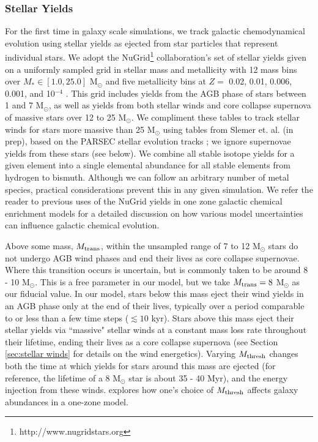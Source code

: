 \documentclass[twocolumn]{aastex61}
\begin{document}
\subsubsection{Stellar Yields}
\label{sec:yields}
For the first time in galaxy scale simulations, we track galactic chemodynamical evolution using stellar yields as ejected from star particles that represent individual stars. We adopt the NuGrid\footnote{http://www.nugridstars.org} collaboration's set of stellar yields given on a uniformly sampled grid in stellar mass and metallicity with 12 mass bins over $M_{*} \in \left[1.0, 25.0\right]$ M$_{\odot}$ and five metallicity bins at $Z =$ 0.02, 0.01, 0.006, 0.001, and 10$^{-4}$ \citep[][Ritter et. al. in prep]{Pignatari2016}. This grid includes yields from the AGB phase of stars between 1 and 7 M$_{\odot}$, as well as yields from both stellar winds and core collapse supernova of massive stars over 12 to 25 M$_{\odot}$. We compliment these tables to track stellar winds for stars more massive than 25 M$_{\odot}$ using tables from Slemer et. al. (in prep), based on the PARSEC stellar evolution tracks \citep{Bressan2012, Tang2014}; we ignore supernovae yields from these stars (see below). We combine all stable isotope yields for a given element into a single elemental abundance for all stable elements from hydrogen to bismuth. Although we can follow an arbitrary number of metal species, practical considerations prevent this in any given simulation. We refer the reader to previous uses of the NuGrid yields in one zone galactic chemical enrichment models \citep{Cote2016,  Cote2016_feb,Cote2017} for a detailed discussion on how various model uncertainties can influence galactic chemical evolution.

Above some mass, $M_{\rm trans}$, within the unsampled range of 7 to 12 M$_{\odot}$ stars do not undergo AGB wind phases and end their lives as core collapse supernovae. Where this transition occurs is uncertain, but is commonly taken to be around 8 - 10 M$_{\odot}$. This is a free parameter in our model, but we take $M_{\rm trans} = 8$ M$_{\odot}$ as our fiducial value. In our model, stars below this mass eject their wind yields in an AGB phase only at the end of their lives, typically over a period comparable to or less than a few time steps ($\lesssim 10$ kyr). Stars above this mass eject their stellar yields via ``massive" stellar winds at a constant mass loss rate throughout their lifetime, ending their lives as a core collapse supernova (see Section \ref{sec:stellar winds} for details on the wind energetics). Varying $M_{\rm thresh}$ changes both the time at which yields for stars around this mass are ejected (for reference, the lifetime of a 8 M$_{\odot}$ star is about 35 - 40 Myr), and the energy injection from these winds. \cite{Cote2017} explores how one's choice of $M_{\rm thresh}$ affects galaxy abundances in a one-zone model.
\end{document}
